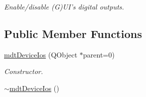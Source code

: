 \begin{DoxyCompactItemize}
\begin{DoxyCompactList}\small\item\em Enable/disable (G)UI's digital outputs. \end{DoxyCompactList}\end{DoxyCompactItemize}
\subsection*{Public Member Functions}
\begin{DoxyCompactItemize}
\item 
\hypertarget{classmdt_device_ios_a44939a10d66421069bdd4b8717e2798c}{
\hyperlink{classmdt_device_ios_a44939a10d66421069bdd4b8717e2798c}{mdtDeviceIos} (QObject $\ast$parent=0)}
\label{classmdt_device_ios_a44939a10d66421069bdd4b8717e2798c}

\begin{DoxyCompactList}\small\item\em Constructor. \end{DoxyCompactList}\item 
\hypertarget{classmdt_device_ios_a8e1e02aeecd2617a8696ba625192bd19}{
\hyperlink{classmdt_device_ios_a8e1e02aeecd2617a8696ba625192bd19}{$\sim$mdtDeviceIos} ()}
\label{classmdt_device_ios_a8e1e02aeecd2617a8696ba625192bd19}


\end{DoxyCompactItemize}
